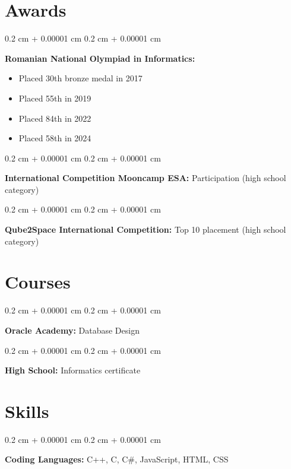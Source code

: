 \documentclass[10pt, letterpaper]{article}
\newenvironment{highlights}{
    \begin{itemize}[
        topsep=0.10 cm,
        parsep=0.10 cm,
        partopsep=0pt,
        itemsep=0pt,
        leftmargin=0.4 cm + 10pt
    ]
}{
    \end{itemize}
} %
\newenvironment{onecolentry}{
    \begin{adjustwidth}{
        0.2 cm + 0.00001 cm
    }{
        0.2 cm + 0.00001 cm
    }
}{
    \end{adjustwidth}
} %
\begin{document}
    \section{Awards}

        
        \begin{onecolentry}
            \textbf{Romanian National Olympiad in Informatics:} 
            \begin{highlights}
                \item Placed 30th bronze medal in 2017
                \item Placed 55th in 2019
                \item Placed 84th in 2022
                \item Placed 58th in 2024
            \end{highlights}
        \end{onecolentry}
         \vspace{0.2 cm}
        \begin{onecolentry}
        \textbf{International Competition Mooncamp ESA: } Participation (high school category)
        \end{onecolentry}
        \begin{onecolentry}
        \textbf{Qube2Space International Competition: } Top 10 placement (high school category)
        \end{onecolentry}
        \vspace{0.2 cm}
    
    \section{Courses}

        
        \begin{onecolentry}
            \textbf{Oracle Academy:} Database Design
        \end{onecolentry}
         \vspace{0.2 cm}
        \begin{onecolentry}
            \textbf{High School:} Informatics certificate
        \end{onecolentry}
        \vspace{0.2 cm}

    
    \section{Skills}

        
        \begin{onecolentry}
            \textbf{Coding Languages:} C++, C, C\#, JavaScript, HTML, CSS
        \end{onecolentry}
\end{document}
